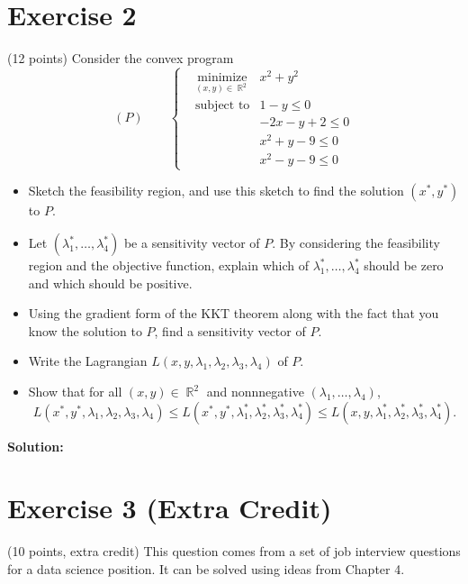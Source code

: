 \documentclass{article}
\DeclareMathOperator{\R}{\mathbb R}
\begin{document}
\newpage

\section*{Exercise 2}
(12 points) Consider the convex program 
 \begin{equation*}
(P)\qquad\left\{\begin{aligned}
& \underset{  (x,y) \in \R^2}{\text{minimize}}
&  x^2 + y^2 \\
& \text{subject to} & 1-y \leq 0 \\
 && -2x-y +2 \leq 0 \\
 && x^2 + y - 9 \leq 0 \\
 && x^2 - y - 9 \leq 0
\end{aligned}\right.
\end{equation*}
\begin{itemize}
\item Sketch the feasibility region, and use this sketch to find the solution $(x^*,y^*)$ to $P$.
\item Let $(\lambda_1^*,\dots,\lambda_4^*)$ be a sensitivity vector of $P$. By considering the feasibility region and the objective function, explain which of $\lambda_1^*, \dots, \lambda_4^*$ should be zero and which should be positive.
\item Using the gradient form of the KKT theorem along with the fact that you know the solution to $P$, find a sensitivity vector of $P$.
\item Write the Lagrangian $L(x,y,\lambda_1, \lambda_2,\lambda_3,\lambda_4)$ of $P$.
\item Show that for all $(x,y) \in \R^2$ and nonnnegative $(\lambda_1,\dots,\lambda_4)$,
\[L(x^*,y^*,\lambda_1,\lambda_2,\lambda_3,\lambda_4) \leq L(x^*,y^*,\lambda_1^*,\lambda_2^*,\lambda_3^*,\lambda_4^*) \leq L(x,y,\lambda_1^*,\lambda_2^*,\lambda_3^*,\lambda_4^*).\]
\end{itemize}

\textbf{Solution:} \\


\newpage

\section*{Exercise 3 (Extra Credit)}
(10 points, extra credit)
This question comes from a set of job interview questions for a data science position. It can be solved using ideas from Chapter 4.
\end{document}
